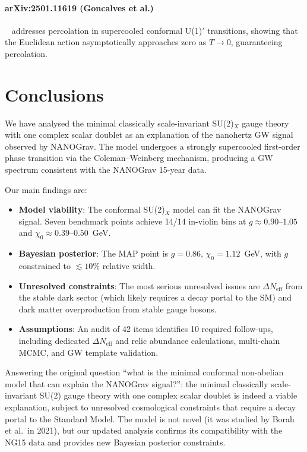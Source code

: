 \documentclass[12pt,a4paper]{article}
\begin{document}
\paragraph{arXiv:2501.11619 (Goncalves et al.)}~\cite{Goncalves:2025} addresses percolation in supercooled conformal U(1)$'$ transitions, showing that the Euclidean action asymptotically approaches zero as $T\rightarrow 0$, guaranteeing percolation.

\section{Conclusions}
\label{sec:conclusions}

We have analysed the minimal classically scale-invariant SU(2)$_X$ gauge theory with one complex scalar doublet as an explanation of the nanohertz GW signal observed by NANOGrav. The model undergoes a strongly supercooled first-order phase transition via the Coleman--Weinberg mechanism, producing a GW spectrum consistent with the NANOGrav 15-year data.

Our main findings are:
\begin{itemize}
\item \textbf{Model viability}: The conformal SU(2)$_X$ model can fit the NANOGrav signal. Seven benchmark points achieve 14/14 in-violin bins at $g \approx 0.90$--$1.05$ and $\chi_0 \approx 0.39$--$0.50$~GeV.
\item \textbf{Bayesian posterior}: The MAP point is $g=0.86$, $\chi_0=1.12$~GeV, with $g$ constrained to $\lesssim 10\%$ relative width.
\item \textbf{Unresolved constraints}: The most serious unresolved issues are $\Delta N_{\text{eff}}$ from the stable dark sector (which likely requires a decay portal to the SM) and dark matter overproduction from stable gauge bosons.
\item \textbf{Assumptions}: An audit of 42 items identifies 10 required follow-ups, including dedicated $\Delta N_{\text{eff}}$ and relic abundance calculations, multi-chain MCMC, and GW template validation.
\end{itemize}

Answering the original question ``what is the minimal conformal non-abelian model that can explain the NANOGrav signal?'': the minimal classically scale-invariant SU(2) gauge theory with one complex scalar doublet is indeed a viable explanation, subject to unresolved cosmological constraints that require a decay portal to the Standard Model. The model is not novel (it was studied by Borah et al.\ in 2021), but our updated analysis confirms its compatibility with the NG15 data and provides new Bayesian posterior constraints.
\end{document}
